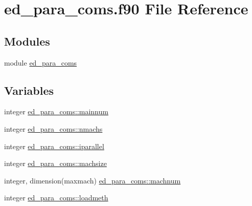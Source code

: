 \hypertarget{ed__para__coms_8f90}{}\section{ed\+\_\+para\+\_\+coms.\+f90 File Reference}
\label{ed__para__coms_8f90}
\subsection*{Modules}
\begin{DoxyCompactItemize}
\item 
module \hyperlink{namespaceed__para__coms}{ed\+\_\+para\+\_\+coms}
\end{DoxyCompactItemize}
\subsection*{Variables}
\begin{DoxyCompactItemize}
\item 
integer \hyperlink{namespaceed__para__coms_a1a6297adee3ed24d243e8acdc8a47ea9}{ed\+\_\+para\+\_\+coms\+::mainnum}
\item 
integer \hyperlink{namespaceed__para__coms_a19b6021232603bcc102754344756972d}{ed\+\_\+para\+\_\+coms\+::nmachs}
\item 
integer \hyperlink{namespaceed__para__coms_a86ef5c2ee27a88377558d7bce3256066}{ed\+\_\+para\+\_\+coms\+::iparallel}
\item 
integer \hyperlink{namespaceed__para__coms_ac54b6ab59f73c004e11f26ed942382c6}{ed\+\_\+para\+\_\+coms\+::machsize}
\item 
integer, dimension(maxmach) \hyperlink{namespaceed__para__coms_a38ed61f526634d9930f8f93a6a65cba4}{ed\+\_\+para\+\_\+coms\+::machnum}
\item 
integer \hyperlink{namespaceed__para__coms_a3ad2033c27d55eca30c6ce0e80c50274}{ed\+\_\+para\+\_\+coms\+::loadmeth}
\end{DoxyCompactItemize}
